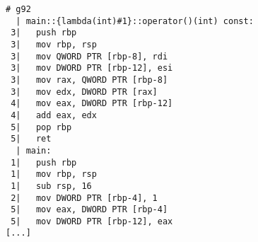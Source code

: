 \begin{lstlisting}[language={},numbers=none,title=\href{https://godbolt.org/z/GtcPkA}{\texttt{godbolt.org/z/GtcPkA}}]
# g92 
  | main::{lambda(int)#1}::operator()(int) const:
 3|   push rbp
 3|   mov rbp, rsp
 3|   mov QWORD PTR [rbp-8], rdi
 3|   mov DWORD PTR [rbp-12], esi
 3|   mov rax, QWORD PTR [rbp-8]
 3|   mov edx, DWORD PTR [rax]
 4|   mov eax, DWORD PTR [rbp-12]
 4|   add eax, edx
 5|   pop rbp
 5|   ret
  | main:
 1|   push rbp
 1|   mov rbp, rsp
 1|   sub rsp, 16
 2|   mov DWORD PTR [rbp-4], 1
 5|   mov eax, DWORD PTR [rbp-4]
 5|   mov DWORD PTR [rbp-12], eax
[...]
\end{lstlisting}
